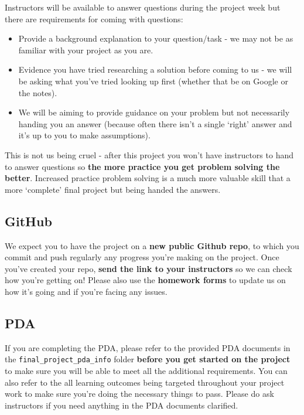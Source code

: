 \documentclass[
]{article}
\providecommand{\tightlist}{%
  \setlength{\itemsep}{0pt}\setlength{\parskip}{0pt}}
\begin{document}
Instructors will be available to answer questions during the project
week but there are requirements for coming with questions:

\begin{itemize}
\tightlist
\item
  Provide a background explanation to your question/task - we may not be
  as familiar with your project as you are.
\item
  Evidence you have tried researching a solution before coming to us -
  we will be asking what you've tried looking up first (whether that be
  on Google or the notes).\\
\item
  We will be aiming to provide guidance on your problem but not
  necessarily handing you an answer (because often there isn't a single
  `right' answer and it's up to you to make assumptions).
\end{itemize}

This is not us being cruel - after this project you won't have
instructors to hand to answer questions so \textbf{the more practice you
get problem solving the better}. Increased practice problem solving is a
much more valuable skill that a more `complete' final project but being
handed the answers.

\hypertarget{github}{%
\subsection{GitHub}\label{github}}

We expect you to have the project on a \textbf{new public Github repo},
to which you commit and push regularly any progress you're making on the
project. Once you've created your repo, \textbf{send the link to your
instructors} so we can check how you're getting on! Please also use the
\textbf{homework forms} to update us on how it's going and if you're
facing any issues.

\hypertarget{pda}{%
\subsection{PDA}\label{pda}}

If you are completing the PDA, please refer to the provided PDA
documents in the \texttt{final\_project\_pda\_info} folder
\textbf{before you get started on the project} to make sure you will be
able to meet all the additional requirements. You can also refer to the
all learning outcomes being targeted throughout your project work to
make sure you're doing the necessary things to pass. Please do ask
instructors if you need anything in the PDA documents clarified.
\end{document}
